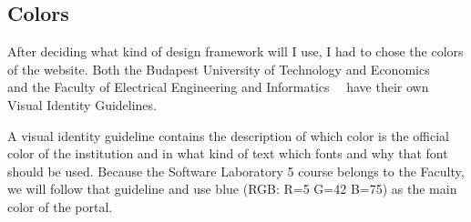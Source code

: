 \subsection{Colors}

After deciding what kind of design framework will I use, I had to chose the colors of the website. Both the Budapest University of Technology and Economics~\cite{BME-Arculat}~\cite{BME-Arculat-Intranet} and the Faculty of Electrical Engineering and Informatics~\cite{VIK-Arculat}~\cite{VIK-Arculat-PDF} have their own Visual Identity Guidelines. 

A visual identity guideline contains the description of which color is the official color of the institution and in what kind of text which fonts and why that font should be used. Because the Software Laboratory 5 course belongs to the Faculty, we will follow that guideline and use blue (RGB: R=5 G=42 B=75) as the main color of the portal. 


